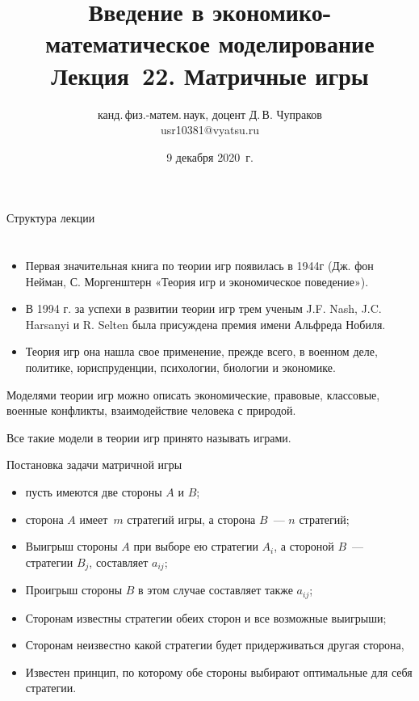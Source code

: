\documentclass[unicode,11pt,notheorems,xcolor=table]{beamer}
\author[Д.\,В. Чупраков]{канд.\,физ.-матем.\,наук, доцент Д.\,В. Чупраков\\[6pt] usr10381@vyatsu.ru}
\institute[ВятГУ]{ФГБОУ ВО Вятский государственный университет}
\title[Лекция~22. Матричные игры -- 1]{
	Введение в экономико-математическое моделирование\\[12pt]
	Лекция~22. Матричные игры}
\date{9 декабря 2020~г.}
\begin{document}
\maketitle

 \begin{frame}{Структура лекции}{}
 	\tableofcontents
 \end{frame}

\section{}

\begin{frame}{}{}
    \begin{itemize}
        \item Первая значительная книга по теории игр появилась в 1944г (Дж. фон Нейман, С. Моргенштерн «Теория игр и экономическое поведение»). 
        \item В 1994 г. за успехи в развитии теории игр трем ученым J.F. Nash, J.C. Harsanyi и R. Selten была присуждена премия имени Альфреда Нобиля.
        \item Теория игр она нашла свое применение, прежде всего, в военном деле, политике, юриспруденции, психологии, биологии и экономике.
    \end{itemize}
\end{frame}

\begin{frame}{}{}
    Моделями теории игр можно описать экономические, правовые, классовые, военные конфликты, взаимодействие человека с природой.

    Все такие модели в теории игр принято называть играми.
\end{frame}



\begin{frame}{Постановка задачи матричной игры}{}
    \begin{itemize}
        \item пусть имеются две стороны $A$ и $B$;
        \item сторона $A$ имеет~$m$ стратегий игры, а сторона $B$~--- $n$ стратегий;
        \item Выигрыш стороны $A$ при выборе ею стратегии $A_i$, а стороной $B$~--- стратегии $B_j$, составляет $a_{ij}$;
        \item Проигрыш стороны $B$ в этом случае составляет также $a_{ij}$;
        \item Сторонам известны стратегии обеих сторон и все возможные выигрыши;
        \item Сторонам неизвестно какой стратегии будет придерживаться другая сторона, 
        \item Известен принцип, по которому обе стороны выбирают оптимальные для себя стратегии.
    \end{itemize}

\end{frame}
\end{document}
